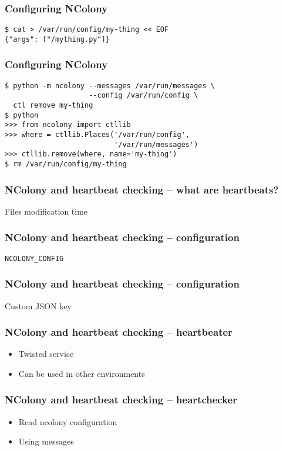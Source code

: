 \documentclass{beamer}
\begin{document}
\begin{frame}[fragile]
\frametitle{Configuring NColony}
\begin{lstlisting}
$ cat > /var/run/config/my-thing << EOF
{"args": ["/mything.py"]}
\end{lstlisting}
\end{frame}

\begin{frame}[fragile]
\frametitle{Configuring NColony}
\begin{lstlisting}
$ python -m ncolony --messages /var/run/messages \
                    --config /var/run/config \
  ctl remove my-thing
$ python
>>> from ncolony import ctllib
>>> where = ctllib.Places('/var/run/config',
                          '/var/run/messages')
>>> ctllib.remove(where, name='my-thing')
$ rm /var/run/config/my-thing
\end{lstlisting}
\end{frame}

\begin{frame}[fragile]
\frametitle{NColony and heartbeat checking -- what are heartbeats?}
Files modification time
\end{frame}

\begin{frame}[fragile]
\frametitle{NColony and heartbeat checking -- configuration}
\begin{lstlisting}
NCOLONY_CONFIG
\end{lstlisting}
\end{frame}

\begin{frame}[fragile]
\frametitle{NColony and heartbeat checking -- configuration}
Custom JSON key
\end{frame}

\begin{frame}[fragile]
\frametitle{NColony and heartbeat checking -- heartbeater}
\begin{itemize}
\item Twisted service \pause
\item Can be used in other environments
\end{itemize}
\end{frame}

\begin{frame}[fragile]
\frametitle{NColony and heartbeat checking -- heartchecker}
\begin{itemize}
\item Read ncolony configuration \pause
\item Using messages
\end{itemize}
\end{frame}
\end{document}
